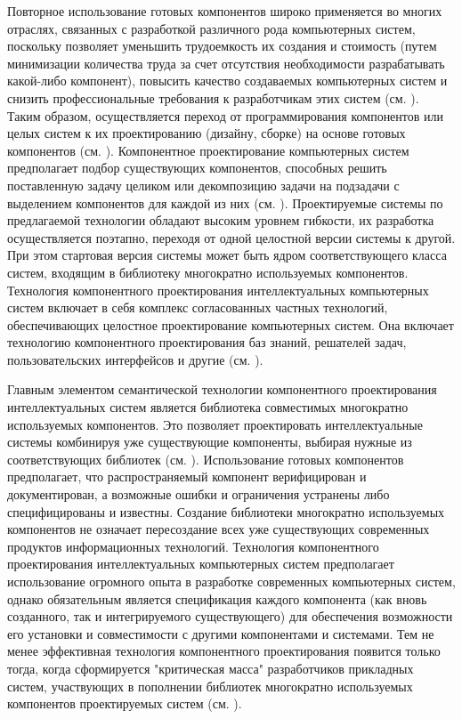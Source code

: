 \bigskip

Повторное использование готовых компонентов широко применяется во многих отраслях, связанных с разработкой различного рода компьютерных систем, поскольку позволяет уменьшить трудоемкость их создания и стоимость (путем минимизации количества труда за счет отсутствия необходимости разрабатывать какой-либо компонент), повысить качество создаваемых компьютерных систем и снизить профессиональные требования к разработчикам этих систем (см. ). Таким образом, осуществляется переход от программирования компонентов или целых систем к их проектированию (дизайну, сборке) на основе готовых компонентов (см. ). Компонентное проектирование компьютерных систем предполагает подбор существующих компонентов, способных решить поставленную задачу целиком или декомпозицию задачи на подзадачи с выделением компонентов для каждой из них (см. ). Проектируемые системы по предлагаемой технологии обладают высоким уровнем гибкости, их разработка осуществляется поэтапно, переходя от одной целостной версии системы к другой. При этом стартовая версия системы может быть ядром соответствующего класса систем, входящим в библиотеку многократно используемых компонентов. Технология компонентного проектирования интеллектуальных компьютерных систем включает в себя комплекс согласованных частных технологий, обеспечивающих целостное проектирование компьютерных систем. Она включает технологию компонентного проектирования баз знаний, решателей задач, пользовательских интерфейсов и другие (см. ). 

Главным элементом семантической технологии компонентного проектирования интеллектуальных систем является библиотека совместимых многократно используемых компонентов. Это позволяет проектировать интеллектуальные системы комбинируя уже существующие компоненты, выбирая нужные из соответствующих библиотек (см. ). Использование готовых компонентов предполагает, что распространяемый компонент верифицирован и документирован, а возможные ошибки и ограничения устранены либо специфицированы и известны. Создание библиотеки многократно используемых компонентов не означает пересоздание всех уже существующих современных продуктов информационных технологий. Технология компонентного проектирования интеллектуальных компьютерных систем предполагает использование огромного опыта в разработке современных компьютерных систем, однако обязательным является спецификация каждого компонента (как вновь созданного, так и интегрируемого существующего) для обеспечения возможности его установки и совместимости с другими компонентами и системами. Тем не менее эффективная технология компонентного проектирования появится только тогда, когда сформируется "критическая масса"{} разработчиков прикладных систем, участвующих в пополнении библиотек многократно используемых компонентов проектируемых систем (см. ).

